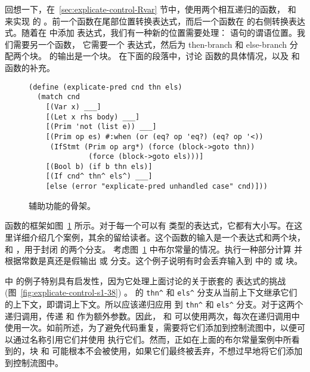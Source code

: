 \documentclass[11pt]{book}
\begin{document}


回想一下，在~\ref{sec:explicate-control-Rvar} 节中，使用两个相互递归的函数，  和 
来实现 \LangVar{} 的  。前一个函数在尾部位置转换表达式，而后一个函数在
 的右侧转换表达式。随着在 \LangIf{} 中添加  表达式，我们有一种新的位置需要处理：  语句的谓语位置。我们需要另一个函数，  它需要一个 \LangIf{} 表达式，然后为 then-branch 和
else-branch 分配两个块。  的输出是一个块。
%
在下面的段落中，讨论 函数的具体情况，以及
 和  函数的补充。

\begin{figure}[tbp]
\begin{lstlisting}
(define (explicate-pred cnd thn els)
  (match cnd
    [(Var x) ___]
    [(Let x rhs body) ___]
    [(Prim 'not (list e)) ___]
    [(Prim op es) #:when (or (eq? op 'eq?) (eq? op '<))
     (IfStmt (Prim op arg*) (force (block->goto thn))
              (force (block->goto els)))]
    [(Bool b) (if b thn els)]
    [(If cnd^ thn^ els^) ___]
    [else (error "explicate-pred unhandled case" cnd)]))
\end{lstlisting}
\caption{  辅助功能的骨架。}
\label{fig:explicate-pred}
\end{figure}

  函数的框架如图~\ref{fig:explicate-pred} 所示。对于每一个可以有  类型的表达式，它都有大小写。在这里详细介绍几个案例，其余的留给读者。这个函数的输入是一个表达式和两个块，  和  ，用于封闭  的两个分支。
%
考虑图~\ref{fig:explicate-pred} 中布尔常量的情况。执行一种部分计算 并根据常数是真还是假输出 
或  分支。这个例子说明有时会丢弃输入到  中的 
或  块。

  中  的例子特别具有启发性，因为它处理上面讨论的关于嵌套的  表达式的挑战
(图~\ref{fig:explicate-control-s1-38}) 。  的 \lstinline{thn^} 和
\lstinline{els^} 分支从当前上下文继承它们的上下文，即谓词上下文。所以应该递归应用  到 \lstinline{thn^} 和
\lstinline{els^} 分支。对于这两个递归调用，传递
 和  作为额外参数。因此， 
和 可以使用两次，每次在递归调用中使用一次。如前所述，为了避免代码重复，需要将它们添加到控制流图中，以便可以通过名称引用它们并使用  执行它们。然而，正如在上面的布尔常量案例中所看到的，块  和  可能根本不会被使用，如果它们最终被丢弃，不想过早地将它们添加到控制流图中。
\end{document}
